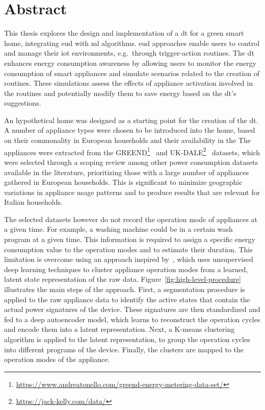 \section*{Abstract}

This thesis explores the design and implementation of a \acrfull{dt} for a green smart home, integrating \acrfull{eud} with \acrfull{ml} algorithms. \acrshort{eud} approaches enable users to control and manage their \acrfull{iot} environments, e.g.\ through trigger-action routines. The \acrshort{dt} enhances energy consumption awareness by allowing users to monitor the energy consumption of smart appliances and simulate scenarios related to the creation of routines. These simulations assess the effects of appliance activation involved in the routines and potentially modify them to save energy based on the \acrshort{dt}'s suggestions.

An hypothetical home was designed as a starting point for the creation of the \acrshort{dt}. A number of appliance types were chosen to be introduced into the home, based on their commonality in European households and their availability in the 
The appliances were extracted from the GREEND\footnote{\url{https://www.andreatonello.com/greend-energy-metering-data-set/}}~\parencite{monacchiGREENDEnergyConsumption2014} and UK-DALE\footnote{\url{https://jack-kelly.com/data/}}~\parencite{kellyUKDALEDatasetDomestic2015} datasets, which were selected through a scoping review among other power consumption datasets available in the literature, prioritizing those with a large number of appliances gathered in European households. This is significant to minimize geographic variations in appliance usage patterns and to produce results that are relevant for Italian households.

The selected datasets however do not record the operation mode of appliances at a given time. For example, a washing machine could be in a certain wash program at a given time. This information is required to assign a specific energy consumption value to the operation modes and to estimate their duration. This limitation is overcome using an approach inspired by~\cite{castangiaClusteringApplianceOperation2023}, which uses unsupervised deep learning techniques to cluster appliance operation modes from a learned, latent state representation of the raw data. Figure~\ref{fig:high-level-procedure} illustrates the main steps of the approach. First, a segmentation procedure is applied
to the raw appliance data to identify the active states that contain the actual power signatures of the device. These signatures are then standardized and fed to a deep autoencoder model, which learns to reconstruct the operation cycles and encode them into a latent representation. Next, a K-means clustering algorithm is applied to the
latent representation, to group the operation cycles into different programs of the device. Finally, the clusters are mapped to the operation modes of the appliance.

